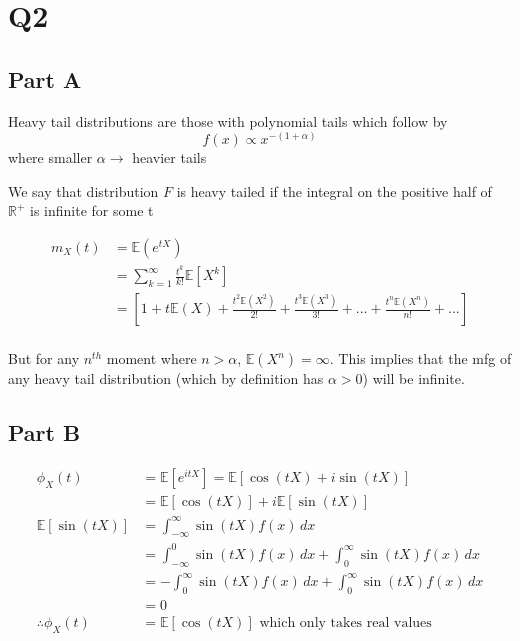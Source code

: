 \documentclass[
  oneside]{book}
\begin{document}
\hypertarget{q2-1}{%
\section{Q2}\label{q2-1}}

\hypertarget{part-a}{%
\subsection{Part A}\label{part-a}}

Heavy tail distributions are those with polynomial tails which follow by
\[f(x) \propto x^{-(1+\alpha)}\]
where smaller \(\alpha \to\) heavier tails

We say that distribution \(F\) is heavy tailed if the integral on the positive half of \(\mathbb{R}^{+}\) is infinite for some t

\[
\begin{aligned}
m_{X}(t) &= \mathbb{E}(e^{tX})\\
&= \sum^{\infty}_{k=1}\frac{t^{k}}{k!}\mathbb{E}[X^{k}]\\
&= \left[ 1 + t\mathbb{E}(X) + \frac{t^2\mathbb{E}(X^2)}{2!} + \frac{t^3\mathbb{E}(X^3)}{3!} + ... + \frac{t^n\mathbb{E}(X^n)}{n!} + ...  \right]\\
\end{aligned}
\]

But for any \(n^{th}\) moment where \(n>\alpha\), \(\mathbb{E}(X^{n})=\infty\). This implies that the mfg of any heavy tail distribution (which by definition has \(\alpha >0\)) will be infinite.

\hypertarget{part-b}{%
\subsection{Part B}\label{part-b}}

\[
\begin{aligned}
\phi_{X}(t) &= \mathbb{E}[e^{itX}] = \mathbb{E}[\cos(tX) + i\sin(tX)]\\
&= \mathbb{E}[\cos(tX)] + i\mathbb{E}[\sin(tX)]\\
\mathbb{E}[\sin(tX)] &= \int ^{\infty}_{-\infty} \sin(tX)f(x)\, dx \\
&= \int ^{0}_{-\infty} \sin(tX)f(x)\, dx + \int ^{\infty}_{0} \sin(tX)f(x)\, dx \\
&= -\int ^{\infty}_{0} \sin(tX)f(x)\, dx + \int ^{\infty}_{0} \sin(tX)f(x)\, dx \\
&= 0\\
\therefore \phi_{X}(t) &= \mathbb{E}[\cos(tX)] \text{ which only takes real values }
\end{aligned}
\]
\end{document}
